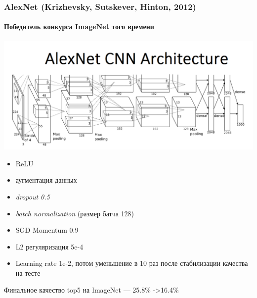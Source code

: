 \documentclass[fullscreen=true, bookmarks=true, hyperref={pdfencoding=unicode}]{beamer}
\begin{document}
\begin{frame}
  \frametitle{AlexNet (Krizhevsky, Sutskever, Hinton, 2012)}
  \framesubtitle{Победитель конкурса ImageNet того времени}
  \begin{center}
    \includegraphics[keepaspectratio,
                     width=0.5\paperwidth]{AlexNetCNN.png}
  \end{center}
  \begin{itemize}
    \item ReLU
    \item аугментация данных
    \item {\it dropout 0.5}
    \item {\it batch normalization} (размер батча 128)
    \item SGD Momentum 0.9
    \item L2 регуляризация 5e-4
    \item Learning rate 1e-2, потом уменьшение в 10 раз после стабилизации качества на тесте
  \end{itemize}

    Финальное качество top5 на ImageNet — 25.8\% ->16.4\%
\end{frame}
\end{document}
